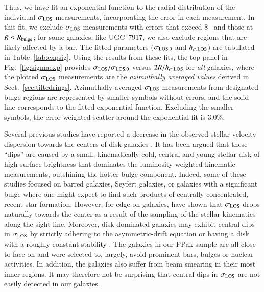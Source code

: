 \documentclass[traditabstract]{aa} %
\begin{document}
Thus, we have fit an exponential function to the radial distribution of the
individual $\sigma_{\rm LOS}$ measurements, incorporating the error in each measurement.
In this fit, we exclude $\sigma_{\rm LOS}$ measurements with errors that exceed 8 \kms\ and
those at $R\leq R_{\rm bulge}$; for some galaxies, like UGC~7917, we also exclude
regions that are likely affected by a bar. The fitted parameters
($\sigma_{\rm LOS,0}$ and $h_{\sigma{\rm,LOS}}$) are tabulated in Table~\ref{tab:expsig}.
Using the results from these fits,
the top panel in Fig.~\ref{fig:sigmaexp} provides $\sigma_{\rm LOS}/\sigma_{\rm LOS,0}$
versus $2R/h_{\sigma{\rm,LOS}}$ for {\it all} galaxies, where the plotted
$\sigma_{\rm LOS}$ measurements are the {\it azimuthally averaged values} derived in
Sect.~\ref{sec:tiltedrings}.  Azimuthally averaged $\sigma_{\rm LOS}$ measurements from
designated bulge regions are represented by smaller symbols without errors, and
the solid line corresponds to the fitted exponential function. Excluding the
smaller symbols, the error-weighted scatter around the exponential fit is 3.0\%.

Several previous studies have reported a decrease in the observed stellar
velocity dispersion towards the centers of disk galaxies \citep{bottema1993,
emsellem2001, marquez2003, shapiro2003, ganda2006}.  It has been argued that
these ``dips'' are caused by a small, kinematically cold, central and young
stellar disk of high surface brightness that dominates the luminosity-weighted
kinematic measurements, outshining the hotter bulge component.  Indeed, some of
these studies focused on barred galaxies, Seyfert galaxies, or galaxies with a
significant bulge where one might expect to find such products of centrally
concentrated, recent star formation.  However, for edge-on galaxies,
\citet{kregel2005a} have shown that $\sigma_{\rm LOS}$ drops naturally towards the center
as a result of the sampling of the stellar kinematics along the sight line.
Moreover, disk-dominated galaxies may exhibit central dips in $\sigma_{\rm LOS}$ by
strictly adhering to the asymmetric-drift equation or having a disk with a
roughly constant stability \citep{westfall2009}. The galaxies in our PPak sample
are all close to face-on and were selected to, largely, avoid prominent bars,
bulges or nuclear activities. In addition, the galaxies also suffer from
beam smearing in their most inner regions. It may therefore not be surprising
that central dips in $\sigma_{\rm LOS}$ are not easily detected in our galaxies.
\end{document}
